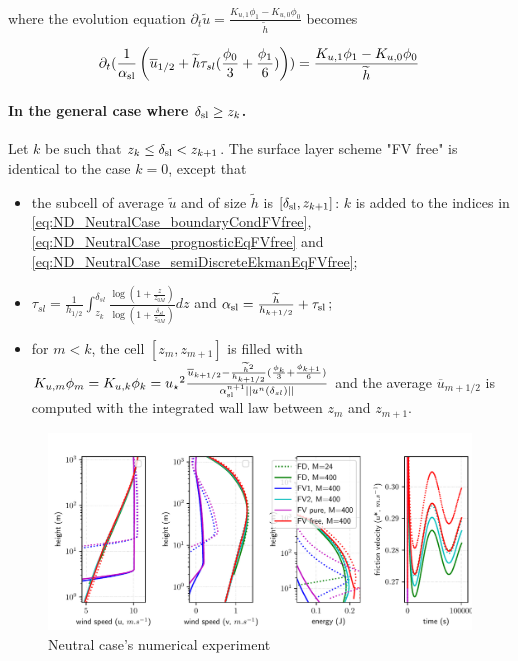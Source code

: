 where the evolution equation 
$ \partial_t \widetilde{u}
= \frac{K_{u, 1}\phi_1 - K_{u,0} \phi_0}{\widetilde{h}}$ becomes

\begin{equation}
	\label{eq:ND_NeutralCase_semiDiscreteEkmanEqFVfree}
	\partial_t (\frac{1}{\alpha_{\rm sl}}\left(\overline{u}_{1/2} + \widetilde{h}\tau_{sl}(\frac{\phi_0}{3} + \frac{\phi_1}{6})\right))
= \frac{K_{u, 1}\phi_1 - K_{u,0} \phi_0}{\widetilde{h}}
\end{equation}
\paragraph{In the general case where $\delta_{\rm sl} \geq z_k$.}
Let $k$ be such that $z_k \leq \delta_{\rm sl} < z_{k+1}$.
The surface layer scheme "FV free" is identical to the case $k=0$, except that
\begin{itemize}
	\item the subcell of average $\widetilde{u}$ and of size
		$\widetilde{h}$ is $[\delta_{\rm sl}, z_{k+1}]$:
		$k$ is added to the indices in 
		\eqref{eq:ND_NeutralCase_boundaryCondFVfree},
		\eqref{eq:ND_NeutralCase_prognosticEqFVfree} and
		\eqref{eq:ND_NeutralCase_semiDiscreteEkmanEqFVfree};
	\item $\tau_{sl} = \frac{1}{{h_{1/2}}}\int_{z_k}^{\delta_{sl}} \frac{\log(1+\frac{z}{z_{0M}})}{\log(1+\frac{\delta_{sl}}{z_{0M}})} dz$ and $\alpha_{\rm sl} = \frac{\widetilde{h}}{h_{k+1/2}} + \tau_{\rm sl}$;
	\item for $m < k$, the cell $[z_m, z_{m+1}]$ is filled with
		$K_{u,m} \phi_m = K_{u,k}\phi_k =
	{u_\star}^2 \frac{\overline{u}_{k+1/2} -
		\frac{\widetilde{h}^2}{h_{k+1/2}}
		(\frac{\phi_k}{3} + \frac{\phi_{k+1}}{6})}
		{\alpha_{\rm sl}^{n+1}||u^n(\delta_{sl})||}$
		and the average $\overline{u}_{m+1/2}$
		is computed with the integrated wall law
		between $z_m$ and $z_{m+1}$.
	
\end{itemize}
\begin{figure}
	\centering
	\includegraphics[scale=0.55]{images/consistency_comparison.pdf}
	\caption{Neutral case's numerical experiment}
	\label{fig:ND_NeutralCase_NumericalExp}
\end{figure}
